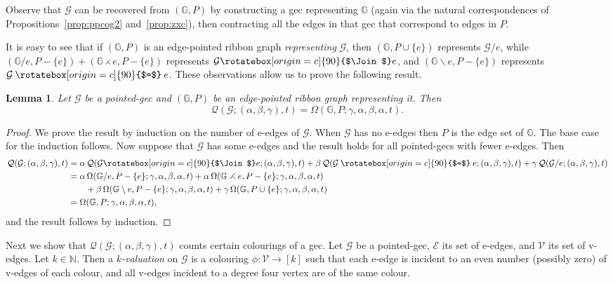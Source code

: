 \documentclass{amsart}
\newcommand{\bG}{\mathbb{G}}
\newcommand{\E}{\mathcal{E}}
\newcommand{\V}{\mathcal{V}}
\newcommand{\Q}{\mathcal{Q}}
\newcommand{\gec}[1]{\mathcal{#1}}
\newcommand{\hsplice}{\rotatebox[origin=c]{90}{$\Join$}}
\newcommand{\vsplice}{\mathbin{\rotatebox[origin=c]{90}{$=$}}}
\newcommand{\ba}{\mathbin{\backslash}}
\newcommand{\tcon}{\mathbin{\rightthreetimes}}
\newtheorem{lemma}[theorem]{Lemma}
\theoremstyle{definition}
\theoremstyle{remark}
\numberwithin{equation}{section}
\begin{document}
Observe that $\gec{G}$ can be recovered from $(\bG,P)$ by constructing a gec representing $\bG$ (again via the natural correspondences of Propositions~\ref{prop:ppcog2} and~\ref{prop:zxc}), then 
contracting all the edges in that gec that correspond to edges in $P$.

It is easy to see that if $(\bG,P)$ is an edge-pointed ribbon graph \emph{representing} $\gec{G}$, then 
$(\bG,P\cup\{e\})$ represents $\gec{G}/e$, while 
$(\bG/e,P-\{e\})+(\bG\tcon e,P-\{e\})$ represents $\gec{G}\hsplice e$,
and 
 $(\bG\ba e,P-\{e\})$ represents $\gec{G}\vsplice e$.
These observations allow us to prove the following result.

\begin{lemma}\label{lem:dhg}
Let $\gec{G}$ be a pointed-gec and $(\bG,P)$ be an edge-pointed ribbon graph representing it. Then
\[ \Q(\gec{G};(\alpha,\beta,\gamma),t) =
\Omega(\bG,P; \gamma, \alpha, \beta,\alpha, t).
\]
\end{lemma}
\begin{proof}
We prove the result by induction on the number of e-edges of $\gec{G}$. When $\gec{G}$ has no e-edges then $P$ is the edge set of $\bG$. The base case for the induction follows. Now suppose that  $\gec{G}$ has some e-edges and the result holds for all pointed-gecs with fewer e-edges. Then
\begin{align*}
\Q(\gec{G};(\alpha,\beta,\gamma),t) &=
\alpha\, \Q(\gec{G} \hsplice e;(\alpha,\beta,\gamma),t) +\beta \, \Q(\gec{G} \vsplice e;(\alpha,\beta,\gamma),t) +\gamma \, \Q(\gec{G} / e;(\alpha,\beta,\gamma),t)
\\&=
\alpha\, \Omega(\bG/e,P-\{e\};\gamma, \alpha, \beta,\alpha, t)+ \alpha\, \Omega(\bG\tcon e,P-\{e\};\gamma, \alpha, \beta,\alpha, t) 
\\&\qquad
+\beta \,\Omega(\bG\ba e,P-\{e\};\gamma, \alpha, \beta,\alpha, t)
+\gamma \,\Omega(\bG,P\cup\{e\};\gamma, \alpha, \beta,\alpha, t)
\\&= \Omega(\bG,P;\gamma, \alpha, \beta,\alpha, t),
\end{align*}
and the result follows by induction.
\end{proof}

\medskip 


Next we show that $\Q(\gec{G};(\alpha,\beta,\gamma),t)$ counts certain colourings of a gec.
Let $\gec{G}$ be a pointed-gec, $\E$ its set of e-edges, and $\V$ its set of v-edges. Let $k\in \mathbb{N}$. Then a \emph{$k$-valuation} on $\gec{G}$ is a colouring  $\phi:\V \rightarrow [k]$ such that each  e-edge is incident to an even number (possibly zero) of v-edges of each colour, and all v-edges incident to a degree four vertex are of the same colour. 
\end{document}
